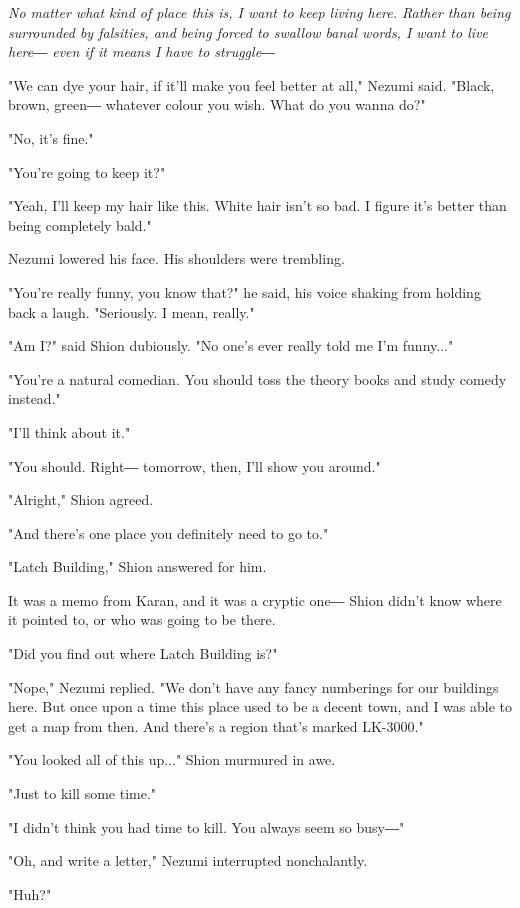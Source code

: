 \emph{No matter what kind of place this is, I want to keep living here. Rather
	than being surrounded by falsities, and being forced to swallow banal
	words, I want to live here― even if it means I have to struggle―}

"We can dye your hair, if it'll make you feel better at all," Nezumi
said. "Black, brown, green― whatever colour you wish. What do you wanna
do?"

"No, it's fine."

"You're going to keep it?"

"Yeah, I'll keep my hair like this. White hair isn't so bad. I figure
it's better than being completely bald."

Nezumi lowered his face. His shoulders were trembling.

"You're really funny, you know that?" he said, his voice shaking from
holding back a laugh. "Seriously. I mean, really."

"Am I?" said Shion dubiously. "No one's ever really told me I'm
funny..."

"You're a natural comedian. You should toss the theory books and study
comedy instead."

"I'll think about it."

"You should. Right― tomorrow, then, I'll show you around."

"Alright," Shion agreed.

"And there's one place you definitely need to go to."

"Latch Building," Shion answered for him.


It was a memo from Karan, and it was a cryptic one― Shion didn't know
where it pointed to, or who was going to be there.

"Did you find out where Latch Building is?"

"Nope," Nezumi replied. "We don't have any fancy numberings for our
buildings here. But once upon a time this place used to be a decent
town, and I was able to get a map from then. And there's a region that's
marked LK-3000."

"You looked all of this up..." Shion murmured in awe.

"Just to kill some time."

"I didn't think you had time to kill. You always seem so busy―"

"Oh, and write a letter," Nezumi interrupted nonchalantly.

"Huh?"

